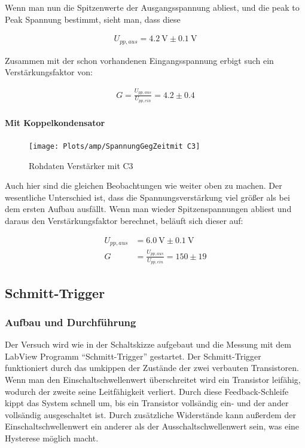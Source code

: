 \documentclass[12pt,twoside,a4paper]{scrartcl}
\begin{document}
				Wenn man nun die Spitzenwerte der Ausgangsspannung abliest, und die peak to Peak Spannung bestimmt, sieht man, dass diese

				\begin{align*}
					U_{pp,aus} = \SI{4.2}{\volt} \pm \SI{0.1}{\volt}
				\end{align*}

				Zusammen mit der schon vorhandenen Eingangsspannung erbigt such ein Verstärkungsfaktor von:

				\begin{align}
					G = \frac{U_{pp,aus}}{U_{pp,ein}} = 4.2 \pm 0.4
				\end{align}

			\paragraph{Mit Koppelkondensator}

			\begin{figure}[H]
				\centering
				\texttt{[image: Plots/amp/SpannungGegZeitmit C3]}
				\caption{Rohdaten Verstärker mit C3}
			\end{figure}

				Auch hier sind die gleichen Beobachtungen wie weiter oben zu machen. Der wesentliche Unterschied ist, dass die Spannungsverstärkung viel größer als bei dem ersten Aufbau ausfällt. Wenn man wieder Spitzenspannungen abliest und daraus den Verstärkungsfaktor berechnet, beläuft sich dieser auf:

				\begin{align}
					U_{pp,aus} &= \SI{6.0}{\volt} \pm \SI{0.1}{\volt} \\
					G &= \frac{U_{pp,aus}}{U_{pp,ein}} = 150 \pm 19
				\end{align}


    \subsection{Schmitt-Trigger}

			\subsubsection{Aufbau und Durchführung}
				Der Versuch wird wie in der Schaltskizze aufgebaut und die Messung mit dem LabView Programm \enquote{Schmitt-Trigger} gestartet.
				Der Schmitt-Trigger funktioniert durch das umkippen der Zustände der zwei verbauten Transistoren. Wenn man den Einschaltschwellenwert überschreitet wird ein Transistor leifähig, wodurch der zweite seine Leitfähigkeit verliert. Durch diese Feedback-Schleife kippt das System schnell um, bis ein Transistor vollsändig ein- und der ander vollsändig ausgeschaltet ist. Durch zusätzliche Widerstände kann außerdem der Einschaltschwellenwert ein anderer als der Ausschaltschwellenwert sein, was eine Hysterese möglich macht.
\end{document}
